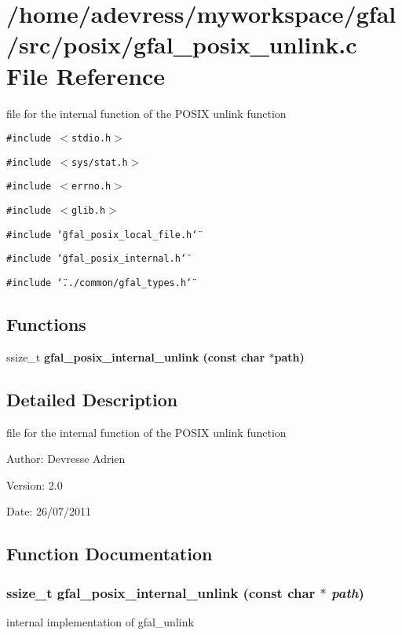 \section{/home/adevress/myworkspace/gfal/src/posix/gfal\_\-posix\_\-unlink.c File Reference}
\label{gfal__posix__unlink_8c}
file for the internal function of the POSIX unlink function 

{\tt \#include $<$stdio.h$>$}\par
{\tt \#include $<$sys/stat.h$>$}\par
{\tt \#include $<$errno.h$>$}\par
{\tt \#include $<$glib.h$>$}\par
{\tt \#include \char`\"{}gfal\_\-posix\_\-local\_\-file.h\char`\"{}}\par
{\tt \#include \char`\"{}gfal\_\-posix\_\-internal.h\char`\"{}}\par
{\tt \#include \char`\"{}../common/gfal\_\-types.h\char`\"{}}\par
\subsection*{Functions}
\begin{CompactItemize}
\item 
ssize\_\-t \bf{gfal\_\-posix\_\-internal\_\-unlink} (const char $\ast$path)
\end{CompactItemize}


\subsection{Detailed Description}
file for the internal function of the POSIX unlink function 

\begin{Desc}
\item[Author:]Devresse Adrien \end{Desc}
\begin{Desc}
\item[Version:]2.0 \end{Desc}
\begin{Desc}
\item[Date:]26/07/2011 \end{Desc}


\subsection{Function Documentation}
\subsubsection{\setlength{\rightskip}{0pt plus 5cm}ssize\_\-t gfal\_\-posix\_\-internal\_\-unlink (const char $\ast$ {\em path})}\label{gfal__posix__unlink_8c_7facf305283ec9fd77f0df1c99d8dfa8}


internal implementation of gfal\_\-unlink 